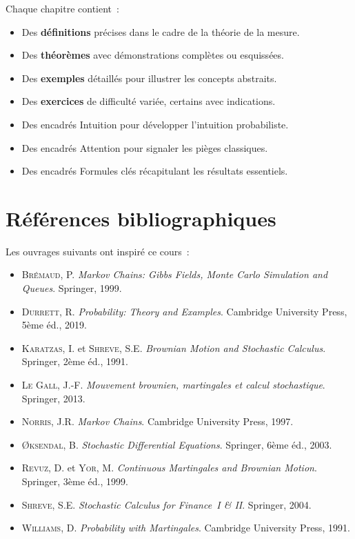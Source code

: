 Chaque chapitre contient~:
\begin{itemize}
  \item Des \textbf{d\'efinitions} pr\'ecises dans le cadre de la th\'eorie de la mesure.
  \item Des \textbf{th\'eor\`emes} avec d\'emonstrations compl\`etes ou esquiss\'ees.
  \item Des \textbf{exemples} d\'etaill\'es pour illustrer les concepts abstraits.
  \item Des \textbf{exercices} de difficult\'e vari\'ee, certains avec indications.
  \item Des encadr\'es \og Intuition \fg pour d\'evelopper l'intuition probabiliste.
  \item Des encadr\'es \og Attention \fg pour signaler les pi\`eges classiques.
  \item Des encadr\'es \og Formules cl\'es \fg r\'ecapitulant les r\'esultats essentiels.
\end{itemize}

\section*{R\'ef\'erences bibliographiques}

Les ouvrages suivants ont inspir\'e ce cours~:

\begin{itemize}
  \item \textsc{Br\'emaud}, P. \emph{Markov Chains: Gibbs Fields, Monte Carlo Simulation
    and Queues}. Springer, 1999.
  \item \textsc{Durrett}, R. \emph{Probability: Theory and Examples}. Cambridge
    University Press, 5\`eme \'ed., 2019.
  \item \textsc{Karatzas}, I. et \textsc{Shreve}, S.E. \emph{Brownian Motion and
    Stochastic Calculus}. Springer, 2\`eme \'ed., 1991.
  \item \textsc{Le Gall}, J.-F. \emph{Mouvement brownien, martingales et calcul
    stochastique}. Springer, 2013.
  \item \textsc{Norris}, J.R. \emph{Markov Chains}. Cambridge University Press, 1997.
  \item \textsc{{\O}ksendal}, B. \emph{Stochastic Differential Equations}. Springer,
    6\`eme \'ed., 2003.
  \item \textsc{Revuz}, D. et \textsc{Yor}, M. \emph{Continuous Martingales and
    Brownian Motion}. Springer, 3\`eme \'ed., 1999.
  \item \textsc{Shreve}, S.E. \emph{Stochastic Calculus for Finance~I \& II}.
    Springer, 2004.
  \item \textsc{Williams}, D. \emph{Probability with Martingales}. Cambridge
    University Press, 1991.
\end{itemize}

